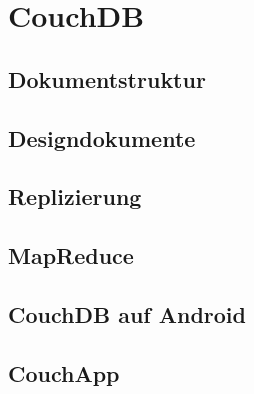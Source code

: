 \section{CouchDB}

\subsection{Dokumentstruktur}

\subsection{Designdokumente}

\subsection{Replizierung}

\subsection{MapReduce}

\subsection{CouchDB auf Android}

\subsection{CouchApp}

